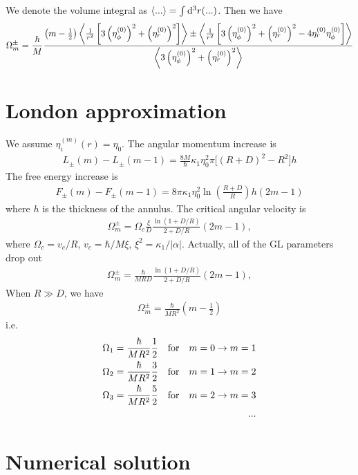 \documentclass[aps,prl,preprint]{revtex4-2}
\begin{document}
We denote the volume integral as $\ev{...}= \int\dd[3]r(...)$.
Then we have
\begin{align}
    \Omega_m^\pm = \frac{\hbar}{M}
    \frac{\left(m-\frac{1}{2}\right)\ev{\frac{1}{r^2}\left[3\left(\eta^{(0)}_\phi\right)^2 + \left(\eta^{(0)}_r\right)^2\right]}
    \pm \ev{\frac{1}{r^2}\left[3\left(\eta^{(0)}_\phi\right)^2 + \left(\eta^{(0)}_r\right)^2-4\eta^{(0)}_r\eta^{(0)}_\phi\right]}}
    {\ev{3\left(\eta^{(0)}_\phi\right)^2 + \left(\eta^{(0)}_r\right)^2}}\nonumber
\end{align}

\section{London approximation}
We assume $\eta_i^{(m)}(r) = \eta_0$.
The angular momentum increase is
\begin{align}
    L_\pm(m) - L_\pm(m-1)
    =\frac{8M}{\hbar}\kappa_1\eta_0^2\pi\bigg[(R+D)^2-R^2\bigg]h
\end{align}
The free energy increase is
\begin{align}
    F_\pm(m)-F_\pm(m-1)=8\pi\kappa_1\eta_0^2\ln(\frac{R+D}{R})h(2m-1)
\end{align}
where $h$ is the thickness of the annulus. The critical angular velocity is
\begin{align}
    \Omega_m^\pm=\Omega_c\frac{\xi}{D}\frac{\ln{(1+D/R)}}{2+D/R}(2m-1),
\end{align}
where $\Omega_c = v_c/R$, $v_c = \hbar/M\xi$, $\xi^2=\kappa_1/|\alpha|$.
Actually, all of the GL parameters drop out
\begin{align}
    \Omega_m^\pm=\frac{\hbar}{MRD}\frac{\ln{(1+D/R)}}{2+D/R}(2m-1),
\end{align}
When $R\gg D$, we have
\begin{align}
    \Omega_m^\pm=\frac{\hbar}{MR^2}\left(m-\frac{1}{2}\right)
\end{align}
i.e.
\begin{align}
    \Omega_1=\frac{\hbar}{MR^2}\frac{1}{2}\qq{for}m=0\rightarrow m=1\\
    \Omega_2=\frac{\hbar}{MR^2}\frac{3}{2}\qq{for}m=1\rightarrow m=2\\
    \Omega_3=\frac{\hbar}{MR^2}\frac{5}{2}\qq{for}m=2\rightarrow m=3\\
    ...
\end{align}

\section{Numerical solution}
\end{document}
